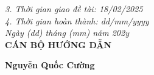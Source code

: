     \textit{3. Thời gian giao đề tài: 18/02/2025} \\[0.2cm]

    \textit{4. Thời gian hoàn thành: dd/mm/yyyy} \\[0.2cm]

\vspace{6pt}
\hspace{7cm}\textit{Ngày (dd) tháng (mm) năm 202y}\\
\vspace{2pt}
\hspace{8.5cm}\textbf{CÁN BỘ HƯỚNG DẪN} \\

\vspace{36pt}

\hspace{8cm}\textbf{Nguyễn Quốc Cường}